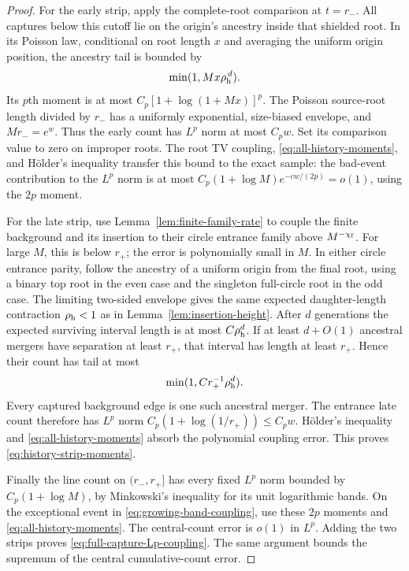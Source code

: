 \documentclass[11pt,letterpaper]{article}
\begin{document}
\begin{proof}
For the early strip, apply the complete-root comparison at $t=r_-$.
All captures below this cutoff lie on the origin's ancestry inside
that shielded root. In its Poisson law, conditional on root length
$x$ and averaging the uniform origin position, the ancestry tail
is bounded by
\[
 \min(1,Mx\rho_{\rm h}^{\,d}).
\]
Its $p$th moment is at most
$C_p[1+\log(1+Mx)]^p$. The Poisson source-root length divided by
$r_-$ has a uniformly exponential, size-biased envelope, and
$Mr_-=e^w$. Thus the early count has $L^p$ norm at most $C_pw$.
Set its comparison value to zero on improper roots. The root TV
coupling, \eqref{eq:all-history-moments}, and H\"older's inequality
transfer this bound to the exact sample: the bad-event contribution
to the $L^p$ norm is at most
$C_p(1+\log M)e^{-cw/(2p)}=o(1)$, using the $2p$ moment.

For the late strip, use Lemma~\ref{lem:finite-family-rate} to couple
the finite background and its insertion to their circle entrance
family above $M^{-\chi_{\rm f}}$. For large $M$, this is below $r_+$;
the error is polynomially small in $M$. In either circle entrance
parity, follow the ancestry of a uniform origin from the final
root, using a binary top root in the even case and the singleton
full-circle root in the odd case. The limiting two-sided envelope
gives the same expected daughter-length contraction
$\rho_{\rm h}<1$ as in Lemma~\ref{lem:insertion-height}.
After $d$ generations the expected surviving interval length is
at most $C\rho_{\rm h}^d$. If at least $d+O(1)$ ancestral mergers
have separation at least $r_+$, that interval has length at least
$r_+$. Hence their count has tail at most
\[
 \min(1,C r_+^{-1}\rho_{\rm h}^d).
\]
Every captured background edge is one such ancestral merger.
The entrance late count therefore has $L^p$ norm
$C_p(1+\log(1/r_+))\le C_pw$.
H\"older's inequality and \eqref{eq:all-history-moments} absorb
the polynomial coupling error. This proves
\eqref{eq:history-strip-moments}.

Finally the line count on $(r_-,r_+]$ has every fixed $L^p$ norm
bounded by $C_p(1+\log M)$, by Minkowski's inequality for its unit
logarithmic bands. On the exceptional event in
\eqref{eq:growing-band-coupling}, use these $2p$ moments and
\eqref{eq:all-history-moments}. The central-count error is $o(1)$
in $L^p$. Adding the two strips proves
\eqref{eq:full-capture-Lp-coupling}. The same argument bounds the
supremum of the central cumulative-count error.
\end{proof}
\end{document}
